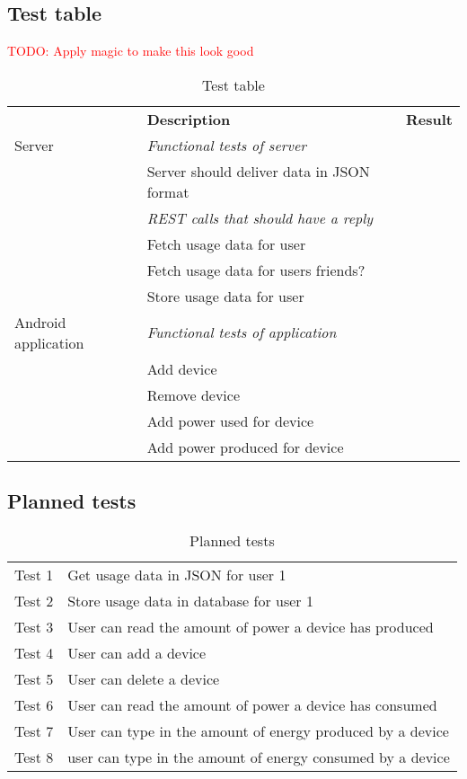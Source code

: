 \subsection{Test table}
\textcolor{red}{TODO: Apply magic to make this look good}
\begin{table}[H]
\centering
{}
\begin{tabular}{|l|l|l|}
\hline
\textbf{ } & \textbf{Description} & \textbf{Result}\\
Server & \textit{Functional tests of server}&\\
&Server should deliver data in JSON format&\\
&\textit{REST calls that should have a reply}&\\
&Fetch usage data for user&\\
&Fetch usage data for users friends?&\\
&Store usage data for user&\\
Android application & \textit{Functional tests of application} &  \\
&Add device&\\
&Remove device&\\
&Add power used for device&\\
&Add power produced for device&\\
\hline
\end{tabular}
\caption{Test table}
\label{tab:testTable}
\end{table}

\subsection{Planned tests}
\begin{table}[H]
\centering
{}
\begin{tabular}{|l|l|}
\hline
Test 1&Get usage data in JSON for user 1\\
Test 2&Store usage data in database for user 1\\
Test 3&User can read the amount of power a device has produced\\
Test 4&User can add a device\\
Test 5&User can delete a device\\
Test 6&User can read the amount of power a device has consumed\\
Test 7&User can type in the amount of energy produced by a device\\
Test 8&user can type in the amount of energy consumed by a device\\
\hline
\end{tabular}
\caption{Planned tests}
\label{tab:plannedTable}
\end{table}

